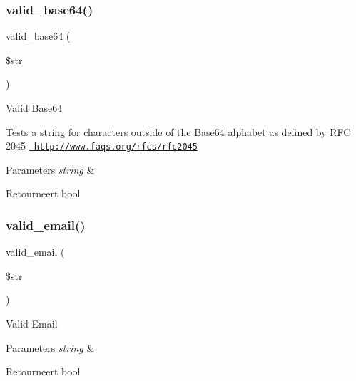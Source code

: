 \subsubsection{\texorpdfstring{valid\_base64()}{valid\_base64()}}
{\footnotesize\ttfamily valid\+\_\+base64 (\begin{DoxyParamCaption}\item[{}]{\$str }\end{DoxyParamCaption})}

Valid Base64

Tests a string for characters outside of the Base64 alphabet as defined by R\+FC 2045 \href{http://www.faqs.org/rfcs/rfc2045}{\texttt{ http\+://www.\+faqs.\+org/rfcs/rfc2045}}


\begin{DoxyParams}{Parameters}
{\em string} & \\
\hline
\end{DoxyParams}
\begin{DoxyReturn}{Retourneert}
bool 
\end{DoxyReturn}
\mbox{\label{class_c_i___form__validation_af7d43edae9c6e388390176b3c62de140}} 
\subsubsection{\texorpdfstring{valid\_email()}{valid\_email()}}
{\footnotesize\ttfamily valid\+\_\+email (\begin{DoxyParamCaption}\item[{}]{\$str }\end{DoxyParamCaption})}

Valid Email


\begin{DoxyParams}{Parameters}
{\em string} & \\
\hline
\end{DoxyParams}
\begin{DoxyReturn}{Retourneert}
bool 
\end{DoxyReturn}
\mbox{\label{class_c_i___form__validation_a7692019b59978c17621e3920823621c4}} 
